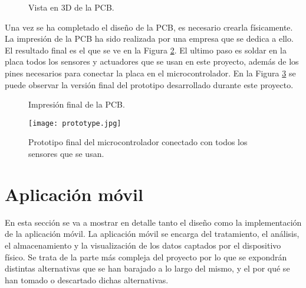 \begin{figure}
 \centering
 \caption{Vista en 3D de la \ac{PCB}.}
 \label{fig:pcb_render}
\end{figure}

Una vez se ha completado el diseño de la \ac{PCB}, es necesario crearla físicamente. La impresión de la \ac{PCB} ha sido realizada por una empresa que se dedica a ello. El resultado final es el que se ve en la Figura \ref{fig:pcb_final}. El ultimo paso es soldar en la placa todos los sensores y actuadores que se usan en este proyecto, además de los pines necesarios para conectar la placa en el microcontrolador. En la Figura \ref{fig:prototype} se puede observar la versión final del prototipo desarrollado durante este proyecto.

\begin{figure}
 \centering
 \caption{Impresión final de la \ac{PCB}.}
 \label{fig:pcb_final}
\end{figure}

\begin{figure}[!h]
\begin{center}
\texttt{[image: prototype.jpg]}
\caption{Prototipo final del microcontrolador conectado con todos los sensores que se usan.}
\label{fig:prototype}
\end{center}
\end{figure}

\section{Aplicación móvil}

En esta sección se va a mostrar en detalle tanto el diseño como la implementación de la aplicación móvil. La aplicación móvil se encarga del tratamiento, el análisis, el almacenamiento y la visualización de los datos captados por el dispositivo físico. Se trata de la parte más compleja del proyecto por lo que se expondrán distintas alternativas que se han barajado a lo largo del mismo, y el por qué se han tomado o descartado dichas alternativas. 

